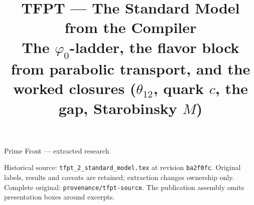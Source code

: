 \documentclass[11pt,a4paper]{article}
\title{\vspace{-1.2cm}\textbf{TFPT --- The Standard Model from the Compiler}\\[2mm]\large The $\varphi_0$-ladder, the flavor block from parabolic transport, and the worked closures ($\theta_{12}$, quark $c$, the gap, Starobinsky $M$)}
\author{\TFPTauthors}\date{\TFPTdatestamp}
\theoremstyle{definition}
\begin{document}
\begin{center}\Large Prime Front --- extracted research\end{center}
\noindent Historical source: \texttt{tfpt\_2\_standard\_model.tex} at revision \texttt{ba2f0fc}. Original labels, results and caveats are retained; extraction changes ownership only. Complete original: \texttt{provenance/tfpt-source}. The publication assembly omits presentation boxes around excerpts.
\tableofcontents
\clearpage

\end{document}
